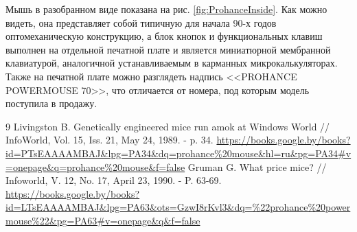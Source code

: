 \documentclass[11pt, a4paper]{article}
\begin{document}
Мышь в разобранном виде показана на рис. \ref{fig:ProhanceInside}. Как можно видеть, она представляет собой типичную для начала 90-х годов оптомеханическую конструкцию, а блок кнопок и функциональных клавиш выполнен на отдельной печатной плате и является миниатюрной мембранной клавиатурой, аналогичной устанавливаемым в карманных микрокалькуляторах. Также на печатной плате можно разглядеть надпись <<PROHANCE POWERMOUSE 70>>, что отличается от номера, под которым модель поступила в продажу.

\begin{thebibliography}{9}
 Livingston B. Genetically engineered mice run amok at Windows World // InfoWorld, Vol. 15, Iss. 21, May 24, 1989. - p. 34. \url{https://books.google.by/books?id=PTsEAAAAMBAJ&lpg=PA34&dq=prohance%20mouse&hl=ru&pg=PA34#v=onepage&q=prohance%20mouse&f=false}
 Gruman G. What price mice? // Infoworld, V. 12, No. 17, April 23, 1990. - P. 63-69. \url{https://books.google.by/books?id=LTsEAAAAMBAJ&lpg=PA63&ots=GzwI8rKvl3&dq=%22prohance%20powermouse%22&pg=PA63#v=onepage&q&f=false}
\end{thebibliography}
\end{document}
